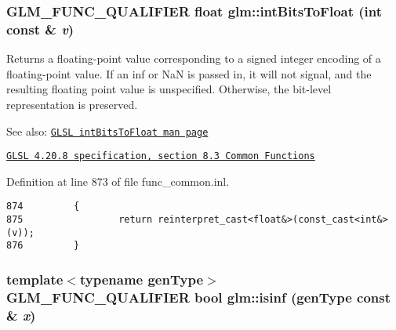 \hypertarget{group__core__func__common_g2650dc57b2148a6ffbce20944fb4d97a}{
\subsubsection[intBitsToFloat]{\setlength{\rightskip}{0pt plus 5cm}GLM\_\-FUNC\_\-QUALIFIER float glm::intBitsToFloat (int const \& {\em v})}}
\label{group__core__func__common_g2650dc57b2148a6ffbce20944fb4d97a}


Returns a floating-point value corresponding to a signed integer encoding of a floating-point value. If an inf or NaN is passed in, it will not signal, and the resulting floating point value is unspecified. Otherwise, the bit-level representation is preserved.

\begin{Desc}
\item[See also:]\href{http://www.opengl.org/sdk/docs/manglsl/xhtml/intBitsToFloat.xml}{\tt GLSL intBitsToFloat man page} 

\href{http://www.opengl.org/registry/doc/GLSLangSpec.4.20.8.pdf}{\tt GLSL 4.20.8 specification, section 8.3 Common Functions} \end{Desc}


Definition at line 873 of file func\_\-common.inl.

\begin{Code}\begin{verbatim}874         {
875                 return reinterpret_cast<float&>(const_cast<int&>(v));
876         }
\end{verbatim}
\end{Code}


\hypertarget{group__core__func__common_g9ab92804679f33124bd9575da9ac6a3a}{
\subsubsection[isinf]{\setlength{\rightskip}{0pt plus 5cm}template$<$typename genType$>$ GLM\_\-FUNC\_\-QUALIFIER bool glm::isinf (genType const \& {\em x})}}
\label{group__core__func__common_g9ab92804679f33124bd9575da9ac6a3a}


